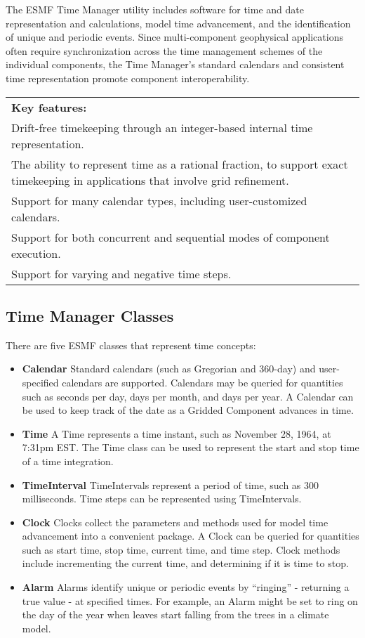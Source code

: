 
The ESMF Time Manager utility includes software for time and date 
representation and calculations, model time advancement, and the 
identification of unique and periodic events.  Since multi-component 
geophysical applications often require synchronization across
the time management schemes of the individual components, the 
Time Manager's standard calendars and consistent time representation 
promote component interoperability.
\begin{center}  
\begin{tabular}{|p{6in}|}
\hline
\vspace{.05in}
{\bf Key features:} \\[.05in]
Drift-free timekeeping through an integer-based internal time 
representation. \\
The ability to represent time as a rational fraction, to support 
exact timekeeping in applications that involve grid refinement. \\
Support for many calendar types, including user-customized calendars. \\
Support for both concurrent and sequential modes of component execution. \\
Support for varying and negative time steps. \\[.05in] \hline
\end{tabular}
\end{center}

\subsection{Time Manager Classes}
There are five ESMF classes that represent time concepts:
\begin{itemize}
\item {\bf Calendar}  Standard calendars (such as Gregorian 
and 360-day) and user-specified calendars are supported.  
Calendars may be queried for quantities such as seconds per day, 
days per month, and days per year.  A Calendar can be 
used to keep track of the date as a Gridded Component advances 
in time. 
\item {\bf Time} A Time represents a time instant, such as 
November 28, 1964, at 7:31pm EST.  The Time class can be used 
to represent the start and stop time of a time integration.
\item {\bf TimeInterval} TimeIntervals represent a period 
of time, such as 300 milliseconds.  Time steps can be represented 
using TimeIntervals.  
\item {\bf Clock} Clocks collect the parameters and 
methods used for model time advancement into a convenient 
package.  A Clock can be queried for quantities such
as start time, stop time, current time, and time step.  Clock
methods include incrementing the current time, and determining
if it is time to stop.  
\item {\bf Alarm} Alarms identify unique or periodic events
by ``ringing'' - returning a true value - at specified times.  
For example, an Alarm might be set to ring on the day of the 
year when leaves start falling from the trees in a climate model.
\end{itemize}

